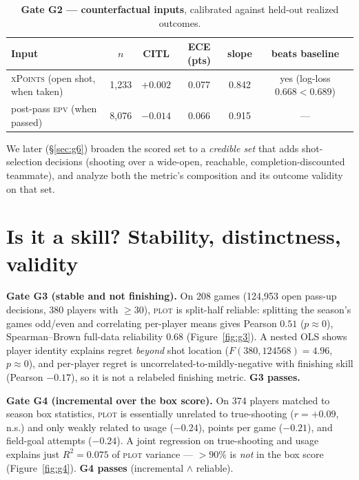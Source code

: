 \documentclass[11pt]{article}
\newcommand{\plot}{\textsc{plot}}
\newcommand{\epv}{\textsc{epv}}
\newcommand{\xpts}{\textsc{xPoints}}
\begin{document}
\begin{table}[t]
\centering
\caption{\textbf{Gate G2 --- counterfactual inputs}, calibrated against held-out realized outcomes.}
\label{tab:g2}
\small
\begin{tabular}{lccccc}
\toprule
Input & $n$ & CITL & ECE (pts) & slope & beats baseline \\
\midrule
\xpts{} (open shot, when taken) & 1{,}233 & $+0.002$ & 0.077 & 0.842 & yes (log-loss $0.668{<}0.689$) \\
post-pass \epv{} (when passed)  & 8{,}076 & $-0.014$ & 0.066 & 0.915 & --- \\
\bottomrule
\end{tabular}
\end{table}

We later (\S\ref{sec:g6}) broaden the scored set to a \emph{credible set} that adds shot-selection
decisions (shooting over a wide-open, reachable, completion-discounted teammate), and analyze both the
metric's composition and its outcome validity on that set.

\section{Is it a skill? Stability, distinctness, validity}\label{sec:skill}
\textbf{Gate G3 (stable and not finishing).} On 208 games (124{,}953 open pass-up decisions, 380 players
with $\ge 30$), \plot{} is split-half reliable: splitting the season's games odd/even and correlating
per-player means gives Pearson $0.51$ ($p\!\approx\!0$), Spearman--Brown full-data reliability $0.68$
(Figure~\ref{fig:g3}). A nested OLS shows player identity explains regret \emph{beyond} shot location
($F(380,124568)=4.96$, $p\!\approx\!0$), and per-player regret is uncorrelated-to-mildly-negative with
finishing skill (Pearson $-0.17$), so it is not a relabeled finishing metric. \textbf{G3 passes.}

\textbf{Gate G4 (incremental over the box score).} On 374 players matched to season box statistics,
\plot{} is essentially unrelated to true-shooting ($r=+0.09$, n.s.) and only weakly related to usage
($-0.24$), points per game ($-0.21$), and field-goal attempts ($-0.24$). A joint regression on
true-shooting and usage explains just $R^2=0.075$ of \plot{} variance --- $>\!90\%$ is \emph{not} in the
box score (Figure~\ref{fig:g4}). \textbf{G4 passes} (incremental $\wedge$ reliable).
\end{document}
